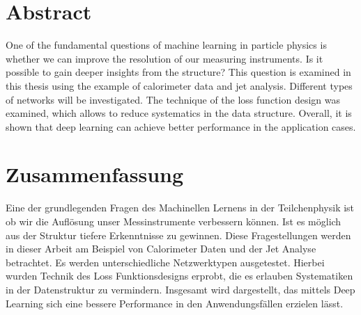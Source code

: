 

\chapter*{Abstract}

One of the fundamental questions of machine learning in particle
physics is whether we can improve the resolution of our measuring
instruments. Is it possible to gain deeper insights from the
structure? This question is examined in this thesis using the example
of calorimeter data and jet analysis. Different types of networks will
be investigated. The technique of the loss function design was
examined, which allows to reduce systematics in the data
structure. Overall, it is shown that deep learning can achieve better
performance in the application cases.

\chapter*{Zusammenfassung}
Eine der grundlegenden Fragen des Machinellen Lernens in der
Teilchenphysik ist ob wir die Auflösung unser Messinstrumente
verbessern können. Ist es möglich aus der Struktur tiefere
Erkenntnisse zu gewinnen. Diese Fragestellungen werden in dieser
Arbeit am Beispiel von Calorimeter Daten und der Jet Analyse
betrachtet. Es werden unterschiedliche Netzwerktypen
ausgetestet. Hierbei wurden Technik des Loss Funktionsdesigns erprobt,
die es erlauben Systematiken in der Datenstruktur zu
vermindern. Insgesamt wird dargestellt, das mittels Deep Learning sich
eine bessere Performance in den Anwendungsfällen erzielen lässt.
